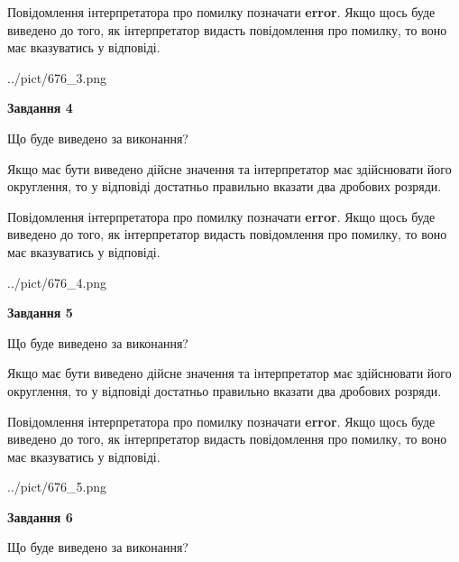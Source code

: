 \documentclass[12pt, ukrainian]{article}
\begin{document}
{\begin {Large}
Повідомлення інтерпретатора про помилку позначати \textbf{error}.
Якщо щось буде виведено до того, як інтерпретатор видасть повідомлення про помилку, 
то воно має вказуватись у відповіді. \par

\begin{center}
	{../pict/676_3.png}
\end{center}
\newpage

{\begin {center}\textbf{Завдання 4}\end {center}}\par
Що буде виведено за виконання? \par

Якщо має бути виведено дійсне значення та інтерпретатор має здійснювати його округлення, 
то у відповіді достатньо правильно вказати два дробових розряди.

Повідомлення інтерпретатора про помилку позначати \textbf{error}.
Якщо щось буде виведено до того, як інтерпретатор видасть повідомлення про помилку, 
то воно має вказуватись у відповіді. \par

\begin{center}
	{../pict/676_4.png}
\end{center}
\newpage

{\begin {center}\textbf{Завдання 5}\end {center}}\par
Що буде виведено за виконання? \par

Якщо має бути виведено дійсне значення та інтерпретатор має здійснювати його округлення, 
то у відповіді достатньо правильно вказати два дробових розряди.

Повідомлення інтерпретатора про помилку позначати \textbf{error}.
Якщо щось буде виведено до того, як інтерпретатор видасть повідомлення про помилку, 
то воно має вказуватись у відповіді. \par

\begin{center}
	{../pict/676_5.png}
\end{center}
\newpage

{\begin {center}\textbf{Завдання 6}\end {center}}\par
Що буде виведено за виконання? \par


\end{Large}}
\end{document}
